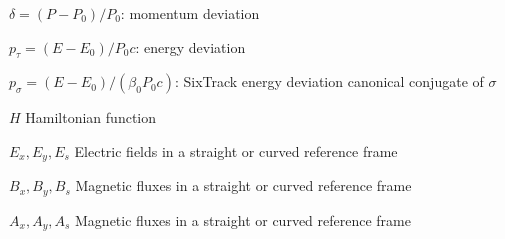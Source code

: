 \documentclass[english]{article}
\begin{document}
\begin{description}
\item $\delta=(P-P_0)/P_0$: momentum deviation
\item $p_\tau=(E-E_0)/P_0c$: energy deviation
\item $p_\sigma=(E-E_0)/(\beta_0 P_0c)$: SixTrack energy deviation canonical conjugate of $\sigma$
\item $H$ Hamiltonian function
\item $E_x, E_y, E_s$ Electric fields in a straight or curved reference frame
\item $B_x, B_y, B_s$ Magnetic fluxes in a straight or curved reference frame
\item $A_x, A_y, A_s$ Magnetic fluxes in a straight or curved reference frame
\end{description}




\end{document}
